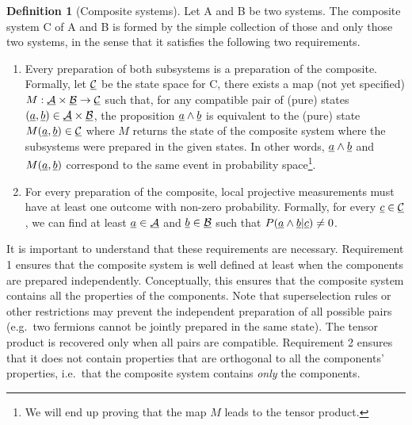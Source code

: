 \documentclass[aps,prl,amsmath,amssymb,twocolumn,nofootinbib]{revtex4}
\theoremstyle{plain}
\theoremstyle{definition}
\newtheorem{defn}[thrm]{Definition}
\theoremstyle{remark}
\newcommand{\pj}[1] {\underbar{$#1$}}
\begin{document}
	\begin{defn}[Composite systems]\label{def_comp}
		Let A and B be two systems. The composite system C of A and B is formed by the simple collection of those and only those two systems, in the sense that it satisfies the following two requirements.
		\begin{enumerate}
			\item Every preparation of both subsystems is a preparation of the
			composite. Formally, let $\pj{\mathcal{C}}$ be the state space
			for C, there exists a map (not yet specified)
			$M:\pj{\mathcal{A}}\times\pj{\mathcal{B}}\to\pj{\mathcal{C}}$
			such that, for any compatible pair of (pure) states $(\pj{a},\pj{b}) \in \pj{\mathcal{A}}\times\pj{\mathcal{B}}$, the proposition $\pj{a} \wedge \pj{b}$ is equivalent to the (pure) state $M(\pj{a},\pj{b}) \in \pj{\mathcal{C}}$ where $M$ returns the state of the composite system where the subsystems were prepared in the given states. In other words, $\pj{a} \wedge \pj{b}$ and $M(\pj{a},\pj{b})$ correspond to the same event in probability space\footnote{We will end up proving that the map $M$ leads to the tensor product.}.
			\item For every preparation of the composite, local projective measurements must have at least one
			outcome with non-zero probability. Formally, for every $\pj{c} \in \pj{\mathcal{C}}$, we can find at least $\pj{a} \in \pj{\mathcal{A}}$ and $\pj{b} \in \pj{\mathcal{B}}$ such that $P(\pj{a} \wedge \pj{b}|\pj{c})\neq 0$. 
		\end{enumerate}
		It is important to understand that these requirements are necessary. Requirement 1 ensures that the composite system is well defined at least when the components are prepared independently. Conceptually, this ensures that the composite system contains all the properties of the components. Note that superselection rules or other restrictions may prevent the independent preparation of all possible pairs (e.g.~two fermions cannot be jointly prepared in the same state). The tensor product is recovered only when all pairs are compatible. Requirement 2 ensures that it does not contain properties that are orthogonal to all the components' properties, i.e.~that the composite system contains {\em only} the components.
	\end{defn}
	
\end{document}
